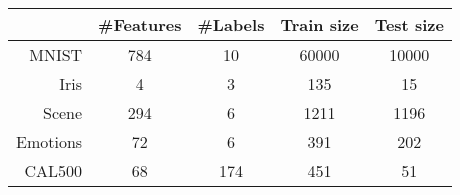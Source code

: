 \begin{tabular}{r|cccc}
& \#Features & \#Labels & Train size & Test size \\
\hline
MNIST & 784 & 10 & 60000 & 10000 \\
Iris & 4 & 3 & 135 & 15 \\
Scene & 294 & 6 & 1211 & 1196 \\
Emotions & 72 & 6 & 391 & 202 \\
CAL500 & 68 & 174 & 451 & 51 \\
\end{tabular}
